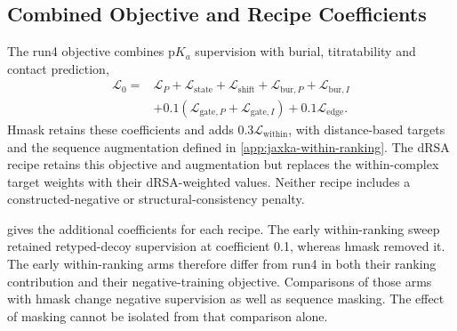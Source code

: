 \subsection{Combined Objective and Recipe Coefficients}
\label{app:jaxka-combined-objective}

The run4 objective combines $\mathrm{p}K_a$ supervision with burial, titratability and contact prediction,
\begin{equation}
    \begin{aligned}
        \mathcal L_0={}&
        \mathcal L_P+\mathcal L_{\mathrm{state}}+\mathcal L_{\mathrm{shift}}
        +\mathcal L_{\mathrm{bur},P}+\mathcal L_{\mathrm{bur},I}\\
        &+0.1\left(\mathcal L_{\mathrm{gate},P}+\mathcal L_{\mathrm{gate},I}\right)
        +0.1\mathcal L_{\mathrm{edge}}.
    \end{aligned}
    \label{eq:jaxka-total-loss}
\end{equation}
Hmask retains these coefficients and adds $0.3\mathcal L_{\mathrm{within}}$, with distance-based targets and the sequence augmentation defined in \cref{app:jaxka-within-ranking}. The dRSA recipe retains this objective and augmentation but replaces the within-complex target weights with their dRSA-weighted values. Neither recipe includes a constructed-negative or structural-consistency penalty.

 gives the additional coefficients for each recipe. The early within-ranking sweep retained retyped-decoy supervision at coefficient 0.1, whereas hmask removed it. The early within-ranking arms therefore differ from run4 in both their ranking contribution and their negative-training objective. Comparisons of those arms with hmask change negative supervision as well as sequence masking. The effect of masking cannot be isolated from that comparison alone.

